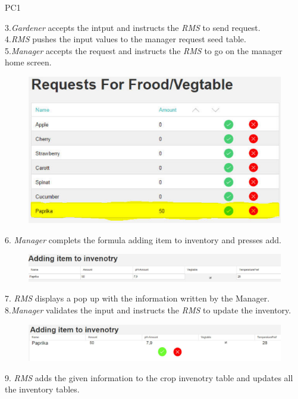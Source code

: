 \begin{lyxlist}{PC1}
{3.\emph{Gardener} accepts the intput and instructs the \emph{RMS} to send
request.\\
4.\emph{RMS} pushes the input values to the manager request seed table.\\
5.\emph{Manager} accepts the request and instructs the \emph{RMS} to go on
the manager home screen.
 \begin{figure}[H]
\includegraphics[width=1\textwidth]{images/AcceptRequestedCropManager.eps}
\end{figure}

6. \emph{Manager} complets the formula adding item to inventory and presses
add.\\
 \begin{figure}[H]
\includegraphics[width=1\textwidth]{images/AddingSeedToTheInventoryManager.eps}
\end{figure}

7. \emph{RMS} displays a pop up with the information written by the Manager.\\
8.\emph{Manager} validates the input and instructs the \emph{RMS} to update the
inventory.\\
 \begin{figure}[H]
\includegraphics[width=1\textwidth]{images/AddingSeedToTheInventoryPopUp.eps}
\end{figure}

9. \emph{RMS} adds the given information to the crop invenotry table and
updates all the inventory tables.\\

}
\end{lyxlist}

